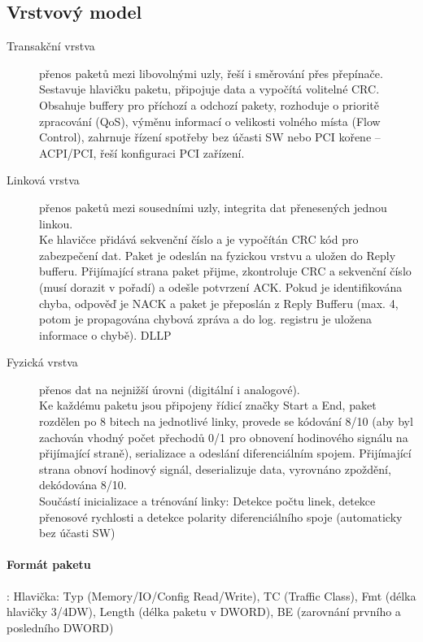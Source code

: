 \documentclass[a4paper, 11pt]{report}
\begin{document}
\subsection{Vrstvový model}
\begin{description}
	\item[Transakční vrstva] přenos paketů mezi libovolnými uzly, řeší i směrování přes přepínače.\\
	Sestavuje hlavičku paketu, připojuje data a vypočítá volitelné CRC. Obsahuje buffery pro příchozí a odchozí pakety, rozhoduje o prioritě zpracování (QoS), výměnu informací o velikosti volného místa (Flow Control), zahrnuje řízení spotřeby bez účasti SW nebo PCI kořene -- ACPI/PCI, řeší konfiguraci PCI zařízení.
	\item[Linková vrstva] přenos paketů mezi sousedními uzly, integrita dat přenesených jednou linkou.\\
	Ke hlavičce přidává sekvenční číslo a je vypočítán CRC kód pro zabezpečení dat. Paket je odeslán na fyzickou vrstvu a uložen do Reply bufferu. Přijímající strana paket přijme, zkontroluje CRC a sekvenční číslo (musí dorazit v pořadí) a odešle potvrzení ACK. Pokud je identifikována chyba, odpověď je NACK a paket je přeposlán z Reply Bufferu (max. 4, potom je propagována chybová zpráva a do log. registru je uložena informace o chybě). DLLP
	\item[Fyzická vrstva] přenos dat na nejnižší úrovni (digitální i analogové).\\
	Ke každému paketu jsou připojeny řídicí značky Start a End, paket rozdělen po 8 bitech na jednotlivé linky, provede se kódování 8/10 (aby byl zachován vhodný počet přechodů 0/1 pro obnovení hodinového signálu na přijímající straně), serializace a odeslání diferenciálním spojem. Přijímající strana obnoví hodinový signál, deserializuje data, vyrovnáno zpoždění, dekódována 8/10.\\
	Součástí inicializace a trénování linky: Detekce počtu linek, detekce přenosové rychlosti a detekce polarity diferenciálního spoje (automaticky bez účasti SW)
\end{description}

\paragraph{Formát paketu}: Hlavička: Typ (Memory/IO/Config Read/Write), TC (Traffic Class), Fmt (délka hlavičky 3/4DW), Length (délka paketu v DWORD), BE (zarovnání prvního a posledního DWORD)
\end{document}
